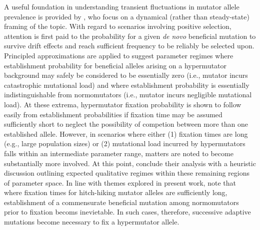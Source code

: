 A useful foundation in understanding transient fluctuations in mutator allele prevalence is provided by \citet{desai2011balance}, who focus on a dynamical (rather than steady-state) framing of the topic.
With regard to scenarios involving positive selection, attention is first paid to the probability for a given \textit{de novo} beneficial mutation to survive drift effects and reach sufficient frequency to be reliably be selected upon.
Principled approximations are applied to suggest parameter regimes where establishment probability for beneficial alleles arising on a hypermutator background may safely be considered to be essentially zero (i.e., mutator incurs catastrophic mutational load) and where establishment probability is essentially indistinguishable from normomutators (i.e., mutator incurs negligible mutational load).
At these extrema, hypermutator fixation probability is shown to follow easily from establishment probabilities if fixation time may be assumed sufficiently short to neglect the possibility of competion between more than one established allele.
However, in scenarios where either (1) fixation times are long (e.g., large population sizes) or (2) mutational load incurred by hypermutators falls within an intermediate parameter range, matters are noted to become substantially more involved.
At this point, \citet{desai2011balance} conclude their analysis with a heuristic discussion outlining expected qualitative regimes within these remaining regions of parameter space.
In line with themes explored in present work, \citet{desai2011balance} note that where fixation times for hitch-hiking mutator alleles are sufficiently long, establishment of a commensurate beneficial mutation among normomutators prior to fixation becoms inevietable.
In such cases, therefore, successive adaptive mutations become necessary to fix a hypermutator allele.

